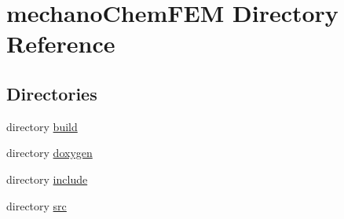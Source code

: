 \section{mechano\-Chem\-F\-E\-M Directory Reference}
\label{dir_e8287acf6eb6417d5f485d26a0e2d0e3}
\subsection*{Directories}
\begin{DoxyCompactItemize}
\item 
directory \hyperlink{dir_1f4411000c7471c55b77bc4d17eedf55}{build}
\item 
directory \hyperlink{dir_cca7feb76ec5d76eaf2b106df0f5fff6}{doxygen}
\item 
directory \hyperlink{dir_cc4ae2288fe3e6634409c16ab2b12d81}{include}
\item 
directory \hyperlink{dir_e7c0b4afef660b0a3039c755da59c894}{src}
\end{DoxyCompactItemize}
